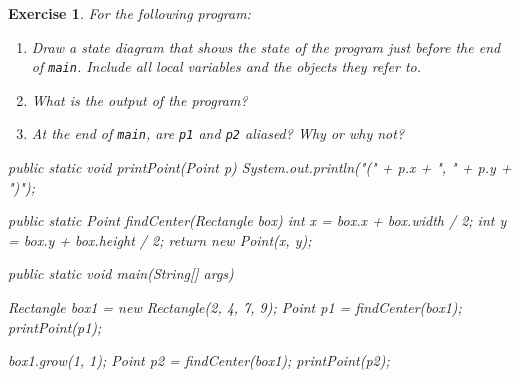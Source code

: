 \documentclass[12pt]{book}
\theoremstyle{exercise}
\newtheorem{exercise}{Exercise}[chapter]
\newcommand{\java}[1]{\verb"#1"}
\newcommand{\java}[1]{\lstinline{#1}} %
\begin{document}
\begin{exercise}
For the following program:

\begin{enumerate}

\item Draw a state diagram that shows the state of the program just before the end of \java{main}.
Include all local variables and the objects they refer to.

\item What is the output of the program?

\item At the end of \java{main}, are \java{p1} and \java{p2} aliased?
Why or why not?

\end{enumerate}

\begin{code}
    public static void printPoint(Point p) {
        System.out.println("(" + p.x + ", " + p.y + ")");
    }

    public static Point findCenter(Rectangle box) {
        int x = box.x + box.width / 2;
        int y = box.y + box.height / 2;
        return new Point(x, y);
    }

    public static void main(String[] args) {
        Rectangle box1 = new Rectangle(2, 4, 7, 9);
        Point p1 = findCenter(box1);
        printPoint(p1);

        box1.grow(1, 1);
        Point p2 = findCenter(box1);
        printPoint(p2);
    }
\end{code}

\end{exercise}
\end{document}
